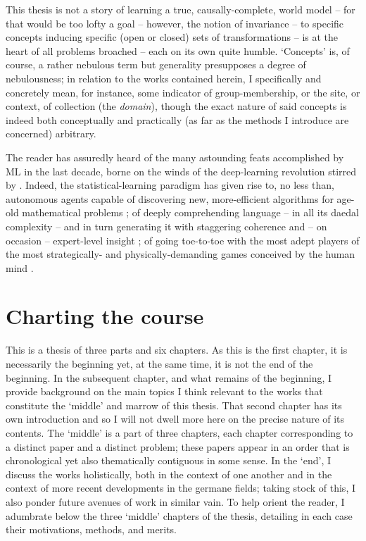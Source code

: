%
This thesis is not a story of learning a true, causally-complete, world model -- for that would be
too lofty a goal -- however, the notion of invariance -- to specific concepts inducing specific
(open or closed) sets of transformations -- is at the heart of all problems broached -- each on
its own quite humble.
%
`Concepts' is, of course, a rather nebulous term but generality presupposes a degree of
nebulousness; in relation to the works contained herein, I specifically and concretely mean, for
instance, some indicator of group-membership, or the site, or context, of collection (the
\emph{domain}), though the exact nature of said concepts is indeed both conceptually and
practically (as far as the methods I introduce are concerned) arbitrary.
%

The reader has assuredly heard of the many astounding feats accomplished by ML in the last decade,
borne on the winds of the deep-learning revolution stirred by \cite{krizhevsky2012imagenet}.
%
Indeed, the statistical-learning paradigm has given rise to, no less than, autonomous agents
capable of discovering new, more-efficient algorithms for age-old mathematical problems
\citep{fawzi2022discovering}; of deeply comprehending language -- in all its daedal complexity --
and in turn generating it with staggering coherence and -- on occasion -- expert-level insight
\citep{brown2020language}; of going toe-to-toe with the most adept players of the most
strategically- and physically-demanding games conceived by the human mind
\citep{silver2017mastering,vinyals2019grandmaster,meta2022human}.



%
\section{Charting the course}\label{sec:charting}
%
This is a thesis of three parts and six chapters. 
%
As this is the first chapter, it is necessarily the beginning yet, at the same time, it is not the
end of the beginning. 
%
In the subsequent chapter, and what remains of the beginning, I provide background on the main
topics I think relevant to the works that constitute the `middle' and marrow of this thesis.
%
That second chapter has its own introduction and so I will not dwell more here on the precise
nature of its contents.
%
The `middle' is a part of three chapters, each chapter corresponding to a distinct paper and a
distinct problem; these papers appear in an order that is chronological yet also thematically
contiguous in some sense.
%
In the `end', I discuss the works holistically, both in the context of one another and in the
context of more recent developments in the germane fields; taking stock of this, I also ponder
future avenues of work in similar vain.
%
To help orient the reader, I adumbrate below the three `middle' chapters of the thesis, detailing
in each case their motivations, methods, and merits.

